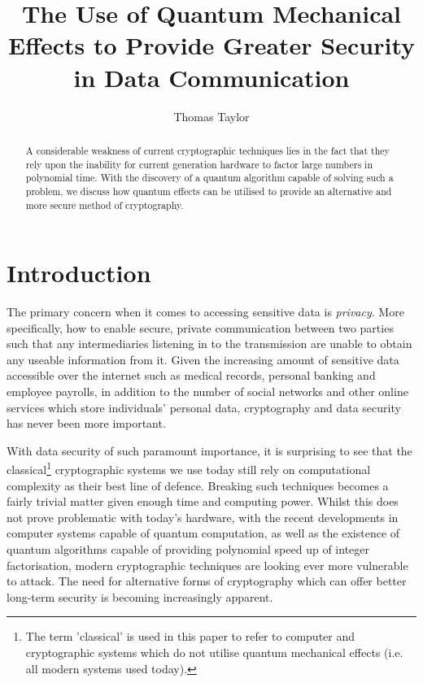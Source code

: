 \documentclass[runningheads,a4paper]{llncs}
\begin{document}
\mainmatter  

\title{The Use of Quantum Mechanical Effects to Provide Greater Security in Data Communication}
\author{Thomas Taylor\\ \mail}

\maketitle

\begin{abstract}
A considerable weakness of current cryptographic techniques lies in the fact that they rely upon the inability for current generation hardware to factor large numbers in polynomial time. With the discovery of a quantum algorithm capable of solving such a problem, we discuss how quantum effects can be utilised to provide an alternative and more secure method of cryptography.

\end{abstract}

\section{Introduction}

The primary concern when it comes to accessing sensitive data is \emph{privacy}. More specifically, how to enable secure, private communication between two parties such that any intermediaries listening in to the transmission are unable to obtain any useable information from it\cite{Rivest:1990fk}. Given the increasing amount of sensitive data accessible over the internet such as medical records, personal banking and employee payrolls, in addition to the number of social networks and other online services which store individuals' personal data, cryptography and data security has never been more important.

With data security of such paramount importance, it is surprising to see that the classical\footnote[1]{The term 'classical' is used in this paper to refer to computer and cryptographic systems which do not utilise quantum mechanical effects (i.e. all modern systems used today).} cryptographic systems we use today still rely on computational complexity as their best line of defence. Breaking such techniques becomes a fairly trivial matter given enough time and computing power. Whilst this does not prove problematic with today's hardware, with the recent developments in computer systems capable of quantum computation\cite{Lu:2007uq}, as well as the existence of quantum algorithms capable of providing polynomial speed up of integer factorisation\cite{Shor:1994fk}, modern cryptographic techniques are looking ever more vulnerable to attack. The need for alternative forms of cryptography which can offer better long-term security is becoming increasingly apparent.
\end{document}
